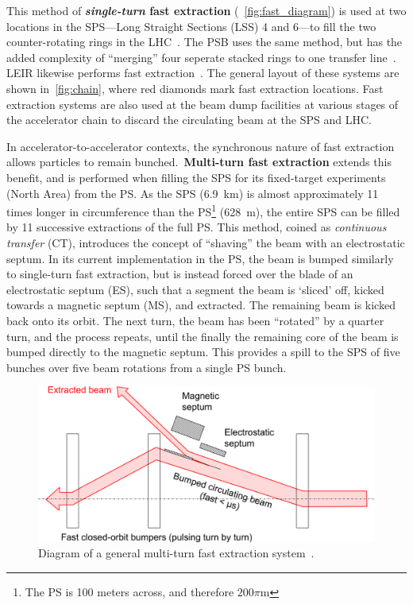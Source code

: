 \documentclass[11pt]{report}
\begin{document}
This method of \textbf{\textit{single-turn} fast extraction} (~\autoref{fig:fast_diagram}) is used at two locations in the SPS---Long Straight Sections (LSS) 4 and 6---to fill the two counter-rotating rings in the LHC~\cite{Fraser:CAS}. The PSB uses the same method, but has the added complexity of ``merging'' four seperate stacked rings to one transfer line~\cite{Metzmacher:2061508}. LEIR likewise performs fast extraction~\cite{Ghithan:2017wpd}. The general layout of these systems are shown in~\ref{fig:chain}, where red diamonds mark fast extraction locations. Fast extraction systems are also used at the beam dump facilities at various stages of the accelerator chain to discard the circulating beam at the SPS and LHC.

In accelerator-to-accelerator contexts, the synchronous nature of fast extraction allows particles to remain bunched.~\textbf{Multi-turn fast extraction} extends this benefit, and is performed when filling the SPS for its fixed-target experiments (North Area) from the PS. As the SPS (\qty{6.9}{km}) is almost approximately 11 times longer in circumference than the PS\footnote{The PS is 100 meters across, and therefore $200\pi$\si{m}} (\qty{628}{m}), the entire SPS can be filled by 11 successive extractions of the full PS. This method, coined as \textit{continuous transfer} (CT), introduces the concept of ``shaving'' the beam with an electrostatic septum. In its current implementation in the PS, the beam is bumped similarly to single-turn fast extraction, but is instead forced over the blade of an electrostatic septum (ES), such that a segment the beam is `sliced' off, kicked towards a magnetic septum (MS), and extracted. The remaining beam is kicked back onto its orbit. The next turn, the beam has been ``rotated'' by a quarter turn, and the process repeats, until the finally the remaining core of the beam is bumped directly to the magnetic septum. This provides a spill to the SPS of five bunches over five beam rotations from a single PS bunch.

\begin{figure}[hb]
  \centering
  \includegraphics[width=\linewidth]{fastmulti.png}
  \caption{Diagram of a general multi-turn fast extraction system~\cite{Fraser:CAS}.}\label{fig:fast_multi_diagram}
\end{figure}
\end{document}
